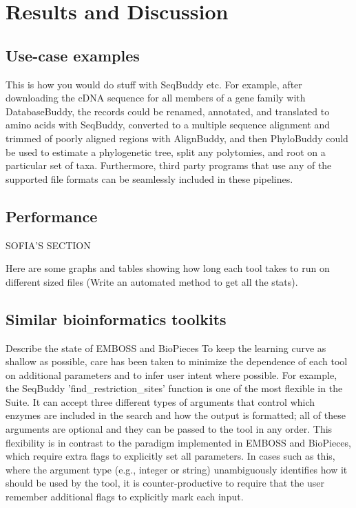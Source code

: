 \documentclass[twocolumn]{bmcart}%
\begin{document}
\section*{Results and Discussion}
\subsection*{Use-case examples}
This is how you would do stuff with SeqBuddy etc.
For example, after downloading the cDNA sequence for all members of a gene family with DatabaseBuddy, the records could be renamed, annotated, and translated to amino acids with SeqBuddy, converted to a multiple sequence alignment and trimmed of poorly aligned regions with AlignBuddy, and then PhyloBuddy could be used to estimate a phylogenetic tree, split any polytomies, and root on a particular set of taxa. Furthermore, third party programs that use any of the supported file formats can be seamlessly included in these pipelines.

\subsection*{Performance}
SOFIA'S SECTION

Here are some graphs and tables showing how long each tool takes to run on different sized files (Write an automated method to get all the stats).

\subsection*{Similar bioinformatics toolkits}
Describe the state of EMBOSS and BioPieces
To keep the learning curve as shallow as possible, care has been taken to minimize the dependence of each tool on additional parameters and to infer user intent where possible. For example, the SeqBuddy 'find\_restriction\_sites' function is one of the most flexible in the Suite. It can accept three different types of arguments that control which enzymes are included in the search and how the output is formatted; all of these arguments are optional and they can be passed to the tool in any order. This flexibility is in contrast to the paradigm implemented in EMBOSS and BioPieces, which require extra flags to explicitly set all parameters. In cases such as this, where the argument type (e.g., integer or string) unambiguously identifies how it should be used by the tool, it is counter-productive to require that the user remember additional flags to explicitly mark each input.
\end{document}
